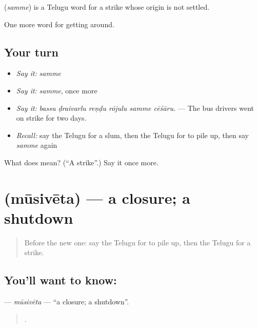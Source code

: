 \begin{cousinweb}
\textbf{} (\emph{samme}) is a Telugu word for a strike whose origin is not settled.
\end{cousinweb}

\begin{grammarlens}[title={What you've built}]
One more word for getting around.
\end{grammarlens}

\subsection*{Your turn}
\begin{itemize}
\raggedright
  \item \emph{Say it:} \emph{samme}
  \item \emph{Say it:} \emph{samme}, once more
  \item \emph{Say it:} \emph{bassu ḍraivarlu reṇḍu rōjulu samme cēśāru.} — The bus drivers went on strike for two days.
  \item \emph{Recall:} say the Telugu for a slum, then the Telugu for to pile up, then say \emph{samme} again
\end{itemize}

\begin{tcolorbox}[breakable,colback=teal!4,colframe=teal!35!black,title={Before you move on}]
What does  mean? (\textquotedblleft{}A strike\textquotedblright{}.) Say it once more.
\end{tcolorbox}
\section[\texorpdfstring{\te{మూసివేత} (mūsivēta)}{మూసివేత (mūsivēta)}]{ (mūsivēta) — a closure; a shutdown}

\label{lesson:TE-C469-musiveta}



\begin{quote}
Before the new one: say the Telugu for to pile up, then the Telugu for a strike.
\end{quote}

\subsection*{You'll want to know: }
\textbf{} — \emph{mūsivēta} — \textquotedblleft{}a closure; a shutdown\textquotedblright{}.

\begin{quote}
     .
\end{quote}

